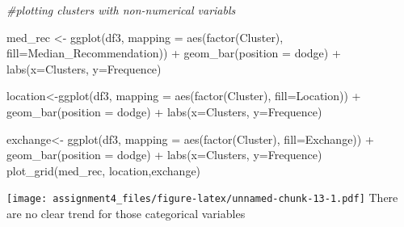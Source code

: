 \documentclass[
]{article}
\newenvironment{Shaded}{\begin{snugshade}}{\end{snugshade}}
\newcommand{\AttributeTok}[1]{\textcolor[rgb]{0.77,0.63,0.00}{#1}}
\newcommand{\CommentTok}[1]{\textcolor[rgb]{0.56,0.35,0.01}{\textit{#1}}}
\newcommand{\FunctionTok}[1]{\textcolor[rgb]{0.00,0.00,0.00}{#1}}
\newcommand{\NormalTok}[1]{#1}
\newcommand{\OtherTok}[1]{\textcolor[rgb]{0.56,0.35,0.01}{#1}}
\newcommand{\SpecialCharTok}[1]{\textcolor[rgb]{0.00,0.00,0.00}{#1}}
\newcommand{\StringTok}[1]{\textcolor[rgb]{0.31,0.60,0.02}{#1}}
\begin{document}
\begin{Shaded}
\begin{Highlighting}[]
\CommentTok{\#plotting clusters with non{-}numerical variabls }

\NormalTok{med\_rec }\OtherTok{\textless{}{-}} \FunctionTok{ggplot}\NormalTok{(df3, }\AttributeTok{mapping =} \FunctionTok{aes}\NormalTok{(}\FunctionTok{factor}\NormalTok{(Cluster), }\AttributeTok{fill=}\NormalTok{Median\_Recommendation)) }\SpecialCharTok{+}
  \FunctionTok{geom\_bar}\NormalTok{(}\AttributeTok{position =} \StringTok{\textquotesingle{}dodge\textquotesingle{}}\NormalTok{) }\SpecialCharTok{+}
  \FunctionTok{labs}\NormalTok{(}\AttributeTok{x=}\StringTok{\textquotesingle{}Clusters\textquotesingle{}}\NormalTok{, }\AttributeTok{y=}\StringTok{\textquotesingle{}Frequence\textquotesingle{}}\NormalTok{)}

\NormalTok{location}\OtherTok{\textless{}{-}}\FunctionTok{ggplot}\NormalTok{(df3, }\AttributeTok{mapping =} \FunctionTok{aes}\NormalTok{(}\FunctionTok{factor}\NormalTok{(Cluster), }\AttributeTok{fill=}\NormalTok{Location)) }\SpecialCharTok{+}
  \FunctionTok{geom\_bar}\NormalTok{(}\AttributeTok{position =} \StringTok{\textquotesingle{}dodge\textquotesingle{}}\NormalTok{) }\SpecialCharTok{+} 
  \FunctionTok{labs}\NormalTok{(}\AttributeTok{x=}\StringTok{\textquotesingle{}Clusters\textquotesingle{}}\NormalTok{, }\AttributeTok{y=}\StringTok{\textquotesingle{}Frequence\textquotesingle{}}\NormalTok{)}

\NormalTok{exchange}\OtherTok{\textless{}{-}} \FunctionTok{ggplot}\NormalTok{(df3, }\AttributeTok{mapping =} \FunctionTok{aes}\NormalTok{(}\FunctionTok{factor}\NormalTok{(Cluster), }\AttributeTok{fill=}\NormalTok{Exchange)) }\SpecialCharTok{+}
 \FunctionTok{geom\_bar}\NormalTok{(}\AttributeTok{position =} \StringTok{\textquotesingle{}dodge\textquotesingle{}}\NormalTok{) }\SpecialCharTok{+} 
  \FunctionTok{labs}\NormalTok{(}\AttributeTok{x=}\StringTok{\textquotesingle{}Clusters\textquotesingle{}}\NormalTok{, }\AttributeTok{y=}\StringTok{\textquotesingle{}Frequence\textquotesingle{}}\NormalTok{)}
\FunctionTok{plot\_grid}\NormalTok{(med\_rec, location,exchange)}
\end{Highlighting}
\end{Shaded}

\texttt{[image: assignment4\_files/figure-latex/unnamed-chunk-13-1.pdf]}
There are no clear trend for those categorical variables
\end{document}
